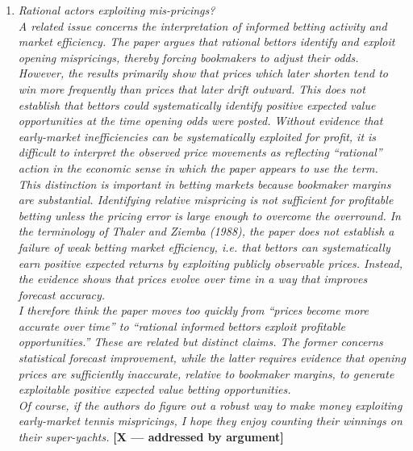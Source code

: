 \documentclass[letterpaper,12pt]{article}
\newcounter{b}
\newcommand{\argX}{\textcolor{green!55!black}{\textbf{[X --- addressed by argument]}}}
\begin{document}
\begin{enumerate}
\item \textit{Rational actors exploiting mis-pricings?\\[6pt]
A related issue concerns the interpretation of informed betting activity and market
efficiency. The paper argues that rational bettors identify and exploit opening mispricings,
thereby forcing bookmakers to adjust their odds. However, the results primarily show that prices which later shorten tend to win more frequently than prices that later drift outward.
This does not establish that bettors could systematically identify positive expected value
opportunities at the time opening odds were posted. Without evidence that early-market
inefficiencies can be systematically exploited for profit, it is difficult to interpret the
observed price movements as reflecting “rational” action in the economic sense in which
the paper appears to use the term.\\[6pt]
This distinction is important in betting markets because bookmaker margins are
substantial. Identifying relative mispricing is not sufficient for profitable betting unless
the pricing error is large enough to overcome the overround. In the terminology of Thaler
and Ziemba (1988), the paper does not establish a failure of weak betting market
efficiency, i.e. that bettors can systematically earn positive expected returns by exploiting
publicly observable prices. Instead, the evidence shows that prices evolve over time in a
way that improves forecast accuracy.\\[6pt]
I therefore think the paper moves too quickly from “prices become more accurate over
time” to “rational informed bettors exploit profitable opportunities.” These are related but
distinct claims. The former concerns statistical forecast improvement, while the latter
requires evidence that opening prices are sufficiently inaccurate, relative to bookmaker
margins, to generate exploitable positive expected value betting opportunities.\\[6pt]
Of course, if the authors do figure out a robust way to make money exploiting early-market
tennis mispricings, I hope they enjoy counting their winnings on their super-yachts. } \argX


\end{enumerate}
\end{document}
